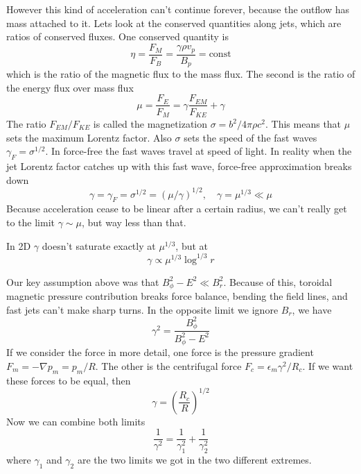 \documentclass[letterpaper, 11pt]{article}
\numberwithin{equation}{section}
\numberwithin{figure}{section}
\begin{document}
However this kind of acceleration can't continue forever, because the outflow
has mass attached to it. Lets look at the conserved quantities along jets, which
are ratios of conserved fluxes. One conserved quantity is
\begin{equation}
  \label{eq:4}
  \eta = \frac{F_M}{F_B} = \frac{\gamma \rho v_p}{B_p} = \mathrm{const}
\end{equation}
which is the ratio of the magnetic flux to the mass flux. The second is the
ratio of the energy flux over mass flux
\begin{equation}
  \label{eq:5}
  \mu = \frac{F_E}{F_M} = \gamma\frac{F_{EM}}{F_{KE}} + \gamma
\end{equation}
The ratio $F_{EM}/F_{KE}$ is called the magnetization $\sigma = b^2/4\pi\rho
c^2$. This means that $\mu$ sets the maximum Lorentz factor. Also $\sigma$ sets
the speed of the fast waves $\gamma_F = \sigma^{1/2}$. In force-free the fast
waves travel at speed of light. In reality when the jet Lorentz factor catches
up with this fast wave, force-free approximation breaks down
\begin{equation}
  \label{eq:6}
  \gamma = \gamma_F = \sigma^{1/2} = (\mu/\gamma)^{1/2},\quad \gamma = \mu^{1/3}\ll \mu
\end{equation}
Because acceleration cease to be linear after a certain radius, we can't really
get to the limit $\gamma \sim \mu$, but way less than that.

In 2D $\gamma$ doesn't saturate exactly at $\mu^{1/3}$, but at
\begin{equation}
  \label{eq:7}
  \gamma \propto \mu^{1/3}\log^{1/3}r
\end{equation}

Our key assumption above was that $B_{\phi}^2 - E^2 \ll B_r^2$. Because of this,
toroidal magnetic pressure contribution breaks force balance, bending the field
lines, and fast jets can't make sharp turns. In the opposite limit we ignore
$B_r$, we have
\begin{equation}
  \label{eq:8}
  \gamma^2 = \frac{B_{\phi}^2}{B_{\phi}^2 - E^2}
\end{equation}
If we consider the force in more detail, one force is the pressure gradient $F_m
= -\nabla p_m = p_m/R$. The other is the centrifugal force $F_{c} =
\epsilon_m\gamma^2/R_{c}$. If we want these forces to be equal, then
\begin{equation}
  \label{eq:9}
  \gamma = \left( \frac{R_{c}}{R} \right)^{1/2}
\end{equation}
Now we can combine both limits
\begin{equation}
  \label{eq:10}
  \frac{1}{\gamma^2} = \frac{1}{\gamma_1^2} + \frac{1}{\gamma_2^2}
\end{equation}
where $\gamma_{1}$ and $\gamma_{2}$ are the two limits we got in the two
different extremes.
\end{document}
